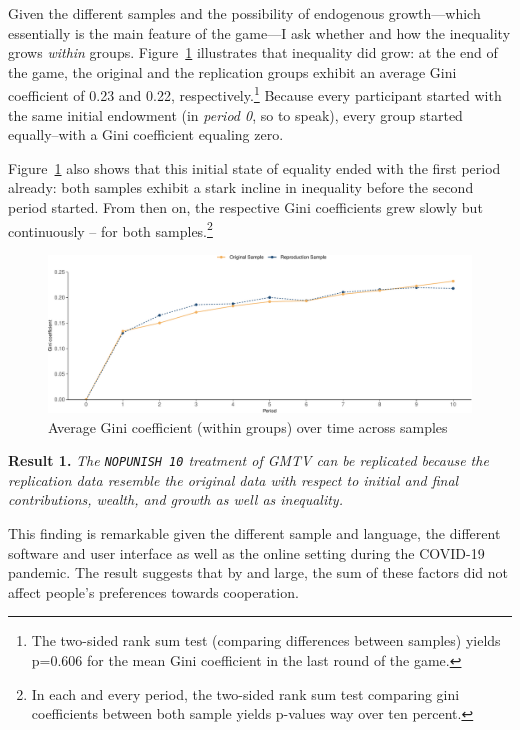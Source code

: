 \documentclass[
  authoryear,
  review,
  3p,
  onecolumn]{elsarticle}
\begin{document}
Given the different samples and the possibility of endogenous
growth---which essentially is the main feature of the game---I ask
whether and how the inequality grows \emph{within} groups.
Figure~\ref{fig-gini-time-series} illustrates that inequality did grow:
at the end of the game, the original and the replication groups exhibit
an average Gini coefficient of 0.23 and 0.22, respectively.\footnote{The
  two-sided rank sum test (comparing differences between samples) yields
  p=0.606 for the mean Gini coefficient in the last round of the game.}
Because every participant started with the same initial endowment (in
\emph{period 0}, so to speak), every group started equally--with a Gini
coefficient equaling zero.

Figure~\ref{fig-gini-time-series} also shows that this initial state of
equality ended with the first period already: both samples exhibit a
stark incline in inequality before the second period started. From then
on, the respective Gini coefficients grew slowly but continuously -- for
both samples.\footnote{In each and every period, the two-sided rank sum
  test comparing gini coefficients between both sample yields p-values
  way over ten percent.}

\begin{figure}

{\centering \includegraphics{paper_files/figure-pdf/fig-gini-time-series-1.pdf}

}

\caption{\label{fig-gini-time-series}Average Gini coefficient (within
groups) over time across samples}

\end{figure}

\textbf{Result 1.} \emph{The \texttt{NOPUNISH\ 10} treatment of GMTV can
be replicated because the replication data resemble the original data
with respect to initial and final contributions, wealth, and growth as
well as inequality.}

This finding is remarkable given the different sample and language, the
different software and user interface as well as the online setting
during the COVID-19 pandemic. The result suggests that by and large, the
sum of these factors did not affect people's preferences towards
cooperation.
\end{document}
